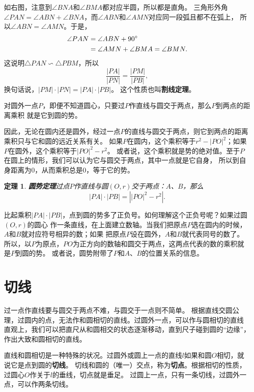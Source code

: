 \documentclass[12pt,UTF8]{ctexbook}
\newtheorem{tm}{定理}[section]
\begin{document}
如右图，注意到$\angle BNA$和$\angle BMA$都对应半圆，所以都是直角。
三角形外角$\angle PAN = \angle ABN + \angle BNA$，而$\angle ABN$和$\angle AMN$对应同一段弧且都不在弧上，
所以$\angle ABN = \angle AMN$。于是，
\begin{align}
    \angle PAN &= \angle ABN + 90^\circ \notag \\
    &= \angle AMN + \angle BMA =\angle BMN. \notag
\end{align}
这说明$\triangle PAN \backsim \triangle PBM$，所以
$$ \frac{|PA|}{|PN|} = \frac{|PM|}{|PB|},$$
换句话说，$|PM|\cdot |PN| = |PA|\cdot |PB|$。
这个性质也叫\textbf{割线定理}。

对圆外一点$P$，即便不知道圆心，只要过$P$作直线与圆交于两点，那么$P$到两点的距离乘积
就是它到圆的势。

因此，无论在圆内还是圆外，经过一点$P$的直线与圆交于两点，则它到两点的距离乘积只与它和圆的远近关系有关。
如果$P$在圆内，这个乘积等于$r^2 - |PO|^2$；如果$P$在圆外，这个乘积等于$|PO|^2 - r^2$。
或者说，这个乘积就是势的绝对值。至于$P$在圆上的情形，我们可以认为它与圆交于两点，其中一点就是它自身，
所以到自身距离为$0$，从而乘积总是$0$，等于它的势。

\begin{tm}\textbf{圆势定理}\label{tm:0-3-40}
    过点$P$作直线与圆$(O, r)$交于两点：$A$、$B$，那么
    $$ |PA| \cdot |PB| = \left||PO|^2 - r^2\right|. $$
\end{tm}

比起乘积$|PA| \cdot |PB|$，点到圆的势多了正负号。如何理解这个正负号呢？如果过圆$(O,r)$的圆心
作一条直线，在上面建立数轴。当我们把原点$P$选在圆内的时候，$A$和$B$就对应符号相异的数；如果
把原点$P$设在圆外，$A$和$B$就代表同号的数了。
所以，以$P$为原点，$PO$为正方向的数轴和圆交于两点，这两点代表的数的乘积就是$P$到圆的势。
或者说，圆势附带了$P$和$A$、$B$的位置关系的信息。

\section{切线}
过一点作直线要与圆交于两点不难，与圆交于一点则不简单。
根据直线交圆公理，过圆内的点，无法作和圆相切的直线。过圆外一点，可以作与圆相切的直线
直观上，我们可以把直尺从和圆相交的状态逐渐移动，直到尺子碰到圆的“边缘”，作出大致和圆相切的直线。

直线和圆相切是一种特殊的状况。过圆外或圆上一点的直线$l$如果和圆$O$相切，就说它是点到圆的\textbf{切线}。
切线和圆的（唯一）交点，称为\textbf{切点}。根据相切的性质，过圆心$O$作关于$l$的垂线，切点就是垂足。
过圆上一点，只有一条切线，过圆外一点，可以作两条切线。
\end{document}
